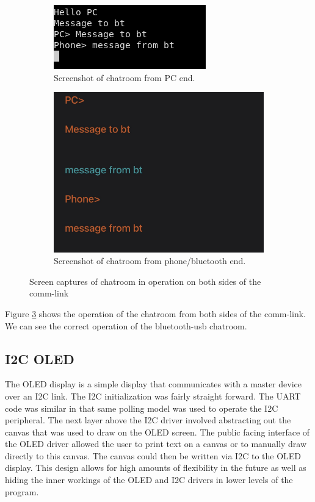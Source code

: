 \documentclass[CMPE]{../KGCOEReport}
\begin{document}
	\begin{figure}[ht]
	\begin{subfigure}{.5\textwidth}
	  \centering
	  \includegraphics[width=.8\linewidth]{chatroom_pc}
	  \caption{Screenshot of chatroom from PC end.}
	  \label{fig:sub-first}
	\end{subfigure}
	\begin{subfigure}{.4\textwidth}
	  \centering
	  \includegraphics[width=.8\linewidth]{chatroom_bt}
	  \caption{Screenshot of chatroom from phone/bluetooth end.}
	  \label{fig:sub-second}
	\end{subfigure}
	\caption{Screen captures of chatroom in operation on both sides of the comm-link}
	\label{fig:p21}
	\end{figure}

	Figure \ref{fig:p21} shows the operation of the chatroom from both sides of the
	comm-link. We can see the correct operation of the bluetooth-usb chatroom.

	\subsection*{I2C OLED}

	The OLED display is a simple display that communicates with a master device over
	an I2C link. The I2C initialization was fairly straight forward. The UART code was
	similar in that same polling model was used to operate the I2C peripheral. The next
	layer above the I2C driver involved abstracting out the canvas that was used to draw
	on the OLED screen. The public facing interface of the OLED driver allowed the user to
	print text on a canvas or to manually draw directly to this canvas. The canvas could
	then be written via I2C to the OLED display. This design allows for high amounts of
	flexibility in the future as well as hiding the inner workings of the OLED and I2C
	drivers in lower levels of the program.\\
\end{document}
